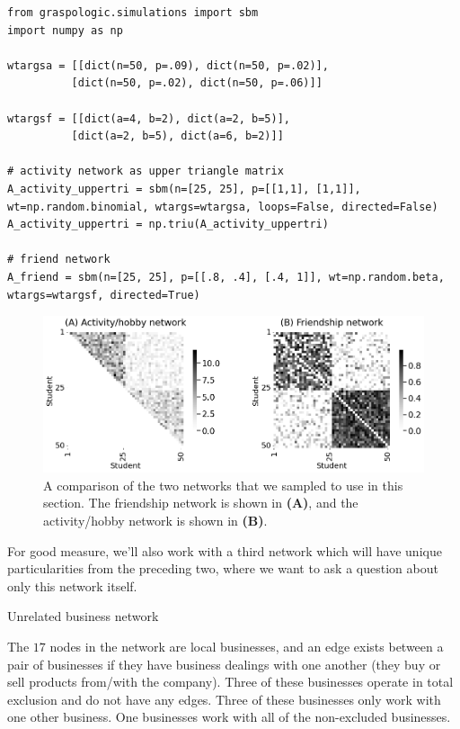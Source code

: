 \begin{lstlisting}[style=python]
from graspologic.simulations import sbm
import numpy as np

wtargsa = [[dict(n=50, p=.09), dict(n=50, p=.02)],
          [dict(n=50, p=.02), dict(n=50, p=.06)]]

wtargsf = [[dict(a=4, b=2), dict(a=2, b=5)],
          [dict(a=2, b=5), dict(a=6, b=2)]]

# activity network as upper triangle matrix
A_activity_uppertri = sbm(n=[25, 25], p=[[1,1], [1,1]], wt=np.random.binomial, wtargs=wtargsa, loops=False, directed=False)
A_activity_uppertri = np.triu(A_activity_uppertri)

# friend network
A_friend = sbm(n=[25, 25], p=[[.8, .4], [.4, 1]], wt=np.random.beta, wtargs=wtargsf, directed=True)
\end{lstlisting}

\begin{figure}[h]
    \centering
    \includegraphics[width=\linewidth]{representations/ch4/Images/friendex.png}
    \caption[Friendship and activities networks]{A comparison of the two networks that we sampled to use in this section. The friendship network is shown in \textbf{(A)}, and the activity/hobby network is shown in \textbf{(B)}.}
    \label{fig:ch4:friendex}
\end{figure}

For good measure, we'll also work with a third network which will have unique particularities from the preceding two, where we want to ask a question about only this network itself. 
\begin{floatingbox}[h]\caption{Unrelated business network}
The $17$ nodes in the network are local businesses, and an edge exists between a pair of businesses if they have business dealings with one another (they buy or sell products from/with the company). Three of these businesses operate in total exclusion and do not have any edges. Three of these businesses only work with one other business. One businesses work with all of the non-excluded businesses. 
\end{floatingbox}

